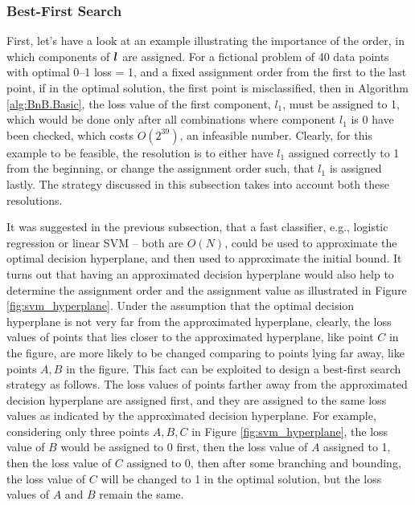 \subsubsection{Best-First Search}
\label{sec:bnb.ordering}

First, let's have a look at an example illustrating the importance of
the order, in which components of $\boldsymbol{l}$ are assigned. For a fictional
problem of 40 data points with optimal 0--1 loss = 1, and a fixed
assignment order from the first to the last point, if in the optimal
solution, the first point is misclassified, then in Algorithm
\ref{alg:BnB.Basic}, the loss value of the first component, $l_1$,
must be assigned to 1, which would be done only after all combinations
where component $l_1$ is $0$ have been checked, which costs
$O(2^{39})$, an infeasible number. Clearly, for this example to be
feasible, the resolution is to either have $l_1$ assigned correctly to
1 from the beginning, or change the assignment order such, that $l_1$
is assigned lastly. The strategy discussed in this subsection takes
into account both these resolutions.

It was suggested in the previous subsection, that a fast classifier,
e.g., logistic regression or linear SVM -- both are $O(N)$, could be
used to approximate the optimal decision hyperplane, and then used to
approximate the initial bound. It turns out that having an
approximated decision hyperplane would also help to determine the
assignment order and the assignment value as illustrated in Figure
\ref{fig:svm_hyperplane}. Under the assumption that the optimal
decision hyperplane is not very far from the approximated hyperplane,
clearly, the loss values of points that lies closer to the
approximated hyperplane, like point $C$ in the figure, are more likely
to be changed comparing to points lying far away, like points $A, B$
in the figure. This fact can be exploited to design a best-first
search strategy as follows. The loss values of points farther away
from the approximated decision hyperplane are assigned first, and they
are assigned to the same loss values as indicated by the approximated
decision hyperplane. For example, considering only three points $A, B,
C$ in Figure \ref{fig:svm_hyperplane}, the loss value of $B$ would be
assigned to 0 first, then the loss value of $A$ assigned to 1, then
the loss value of $C$ assigned to 0, then after some branching and
bounding, the loss value of $C$ will be changed to 1 in the optimal
solution, but the loss values of $A$ and $B$ remain the same.

